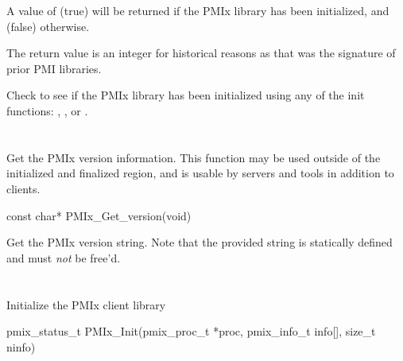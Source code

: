 A value of  (true) will be returned if the \ac{PMIx} library has been initialized, and  (false) otherwise.

\rationalestart
The return value is an integer for historical reasons as that was the signature of prior PMI libraries.
\rationaleend

\descr

Check to see if the \ac{PMIx} library has been initialized using any of the init functions:
, , or .


\section{}

\summary

Get the \ac{PMIx} version information. This function may be used outside of the initialized and finalized region, and is usable by servers and tools in addition to clients.

\format

\cspecificstart
\begin{codepar}
const char* PMIx_Get_version(void)
\end{codepar}
\cspecificend

\descr

Get the \ac{PMIx} version string.
Note that the provided string is statically defined and must \textit{not} be free'd.


\section{}

\summary

Initialize the \ac{PMIx} client library

\format

\cspecificstart
\begin{codepar}
pmix_status_t
PMIx_Init(pmix_proc_t *proc,
          pmix_info_t info[], size_t ninfo)
\end{codepar}
\cspecificend

\begin{arglist}
\end{arglist}

